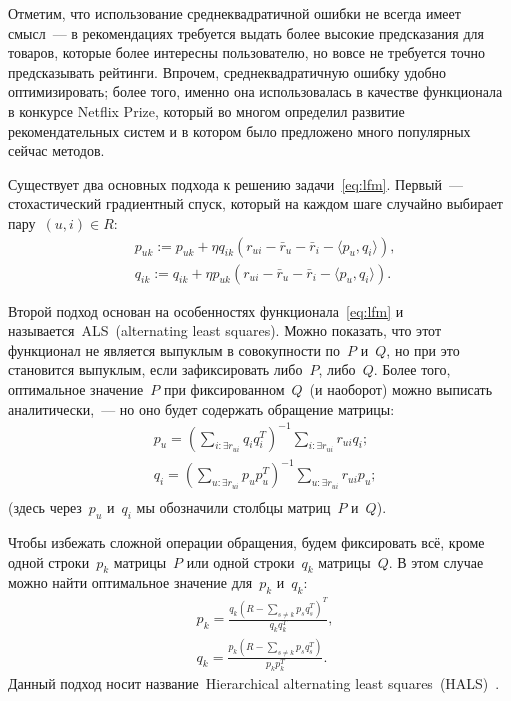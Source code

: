 \documentclass[12pt,fleqn]{article}
\begin{document}
	Отметим, что использование среднеквадратичной ошибки не всегда имеет смысл~---
	в рекомендациях требуется выдать более высокие предсказания для товаров, которые более интересны пользователю,
	но вовсе не требуется точно предсказывать рейтинги.
	Впрочем, среднеквадратичную ошибку удобно оптимизировать;
	более того, именно она использовалась в качестве функционала в конкурсе Netflix Prize,
	который во многом определил развитие рекомендательных систем и в котором было предложено много
	популярных сейчас методов.
	
	Существует два основных подхода к решению задачи~\eqref{eq:lfm}.
	Первый~--- стохастический градиентный спуск, который на каждом шаге случайно выбирает пару~$(u, i) \in R$:
	\begin{align*}
	&p_{uk}
	:=
	p_{uk}
	+
	\eta
	q_{ik}
	\left(
	r_{ui}
	- \bar r_u
	- \bar r_i
	- \langle p_u, q_i \rangle
	\right),\\
	&q_{ik}
	:=
	q_{ik}
	+
	\eta
	p_{uk}
	\left(
	r_{ui}
	- \bar r_u
	- \bar r_i
	- \langle p_u, q_i \rangle
	\right).
	\end{align*}
	
	Второй подход основан на особенностях функционала~\eqref{eq:lfm} и называется~ALS~(alternating least squares).
	Можно показать, что этот функционал не является выпуклым в совокупности по~$P$ и~$Q$,
	но при это становится выпуклым, если зафиксировать либо~$P$, либо~$Q$.
	Более того, оптимальное значение~$P$ при фиксированном~$Q$~(и наоборот) можно выписать аналитически,~---
	но оно будет содержать обращение матрицы:
	\begin{align*}
	&p_u
	=
	\left(
	\sum_{i: \exists r_{ui}}
	q_i q_i^T
	\right)^{-1}
	\sum_{i: \exists r_{ui}}
	r_{ui} q_i;\\
	&q_i
	=
	\left(
	\sum_{u: \exists r_{ui}}
	p_u p_u^T
	\right)^{-1}
	\sum_{u: \exists r_{ui}}
	r_{ui} p_u;\\
	\end{align*}
	(здесь через~$p_u$ и~$q_i$ мы обозначили столбцы матриц~$P$ и~$Q$).
	
	Чтобы избежать сложной операции обращения, будем фиксировать всё, кроме одной строки~$p_k$ матрицы~$P$
	или одной строки~$q_k$ матрицы~$Q$.
	В этом случае можно найти оптимальное значение для~$p_k$ и~$q_k$:
	\begin{align*}
	&p_k
	=
	\frac{q_k (R - \sum_{s \neq k} p_s q_s^T)^T}{q_k q_k^T},\\
	&q_k
	=
	\frac{p_k (R - \sum_{s \neq k} p_s q_s^T)}{p_k p_k^T}.
	\end{align*}
	Данный подход носит название~Hierarchical alternating least squares~(HALS)~\cite{gillis12hals}.
	
\end{document}
